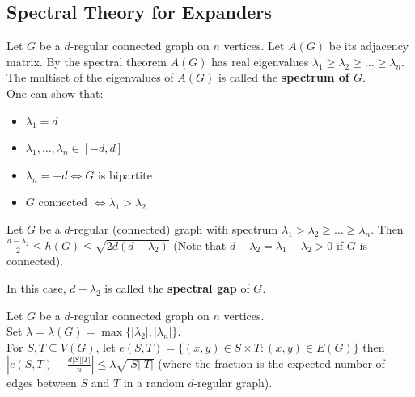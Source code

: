 \subsection{Spectral Theory for Expanders}
Let $G$ be a $d$-regular connected graph on $n$ vertices. Let $A(G)$ be its adjacency matrix. By the spectral theorem $A(G)$ has real eigenvalues $\lambda_1\geq\lambda_2\geq\ldots\geq\lambda_n$. The multiset of the eigenvalues of $A(G)$ is called the \textbf{spectrum of $G$}.\\
One can show that:\begin{itemize}
    \item $\lambda_1=d$
    \item $\lambda_1,\ldots,\lambda_n\in[-d,d]$
    \item $\lambda_n=-d\iff G$ is bipartite
    \item $G$ connected $\iff \lambda_1>\lambda_2$ 
\end{itemize}
\begin{lemma}\label{9.8}
    Let $G$ be a $d$-regular (connected) graph with spectrum $\lambda_1>\lambda_2\geq\ldots\geq\lambda_n$. Then $\frac{d-\lambda_2}{2}\leq h(G)\leq \sqrt{2d(d-\lambda_2)}$ (Note that $d-\lambda_2=\lambda_1-\lambda_2>0$ if $G$ is connected).
\end{lemma}
\begin{definition}\label{9.9}
    In this case, $d-\lambda_2$ is called the \textbf{spectral gap} of $G$.
\end{definition}
\begin{theorem}\label{9.10}
    Let $G$ be a $d$-regular connected graph on $n$ vertices.\\
    Set $\lambda=\lambda(G)=\max\{|\lambda_2|,|\lambda_n|\}$.\\
    For $S,T\subseteq V(G)$, let $e(S,T)=\{(x,y)\in S\times T: (x,y)\in E(G)\}$ then $|e(S,T)-\frac{d|S||T|}{n}|\leq \lambda\sqrt{|S||T|}$ (where the fraction is the expected number of edges between $S$ and $T$ in a random $d$-regular graph).  
\end{theorem}
